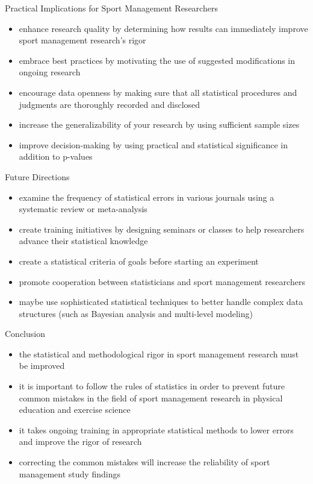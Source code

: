 \documentclass[aspectratio=169, 12pt]{beamer}
\begin{document}
\begin{frame}{Practical Implications for Sport Management Researchers}
  \begin{itemize}
      \item enhance research quality by determining how results can immediately improve sport management research's rigor
      \item embrace best practices by motivating the use of suggested modifications in ongoing research
      \item encourage data openness by making sure that all statistical procedures and judgments are thoroughly recorded and disclosed
      \item increase the generalizability of your research by using sufficient sample sizes
      \item improve decision-making by using practical and statistical significance in addition to p-values
  \end{itemize}
\end{frame}


\begin{frame}{Future Directions}
  \begin{itemize}
      \item examine the frequency of statistical errors in various journals using a systematic review or meta-analysis
      \item create training initiatives by designing seminars or classes to help researchers advance their statistical knowledge
      \item create a statistical criteria of goals before starting an experiment
      \item promote cooperation between statisticians and sport management researchers
      \item maybe use sophisticated statistical techniques to better handle complex data structures (such as Bayesian analysis and multi-level modeling)
  \end{itemize}
\end{frame}


\begin{frame}{Conclusion}
  \begin{itemize}
      \item the statistical and methodological rigor in sport management research must be improved
      \item it is important to follow the rules of statistics in order to prevent future common mistakes in the field of sport management research in physical education and exercise science
      \item it takes ongoing training in appropriate statistical methods to lower errors and improve the rigor of research
      \item correcting the common mistakes will increase the reliability of sport management study findings
  \end{itemize}
\end{frame}
\end{document}
